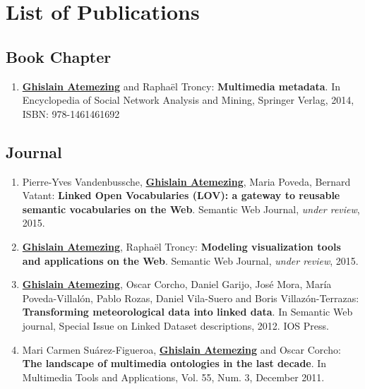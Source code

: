 \chapter*{List of Publications}

\section*{Book Chapter}
\label{sec:book}
\begin{enumerate}
\item \underline{\textbf{Ghislain Atemezing}} and {R}apha{\"e}l {T}roncy: \textbf{{M}ultimedia metadata}. {I}n {E}ncyclopedia of {S}ocial {N}etwork {A}nalysis and {M}ining, {S}pringer {V}erlag, 2014, {ISBN}: 978-1461461692
\end{enumerate}

\section*{Journal}
\label{sec:journal}
\begin{enumerate}
 \item Pierre-Yves Vandenbussche, \underline{\textbf{Ghislain Atemezing}}, Maria Poveda, Bernard Vatant: \textbf{Linked Open Vocabularies (LOV): a gateway to reusable semantic vocabularies on the Web}. Semantic Web Journal, \emph{under review}, 2015.
 \item \underline{\textbf{Ghislain Atemezing}}, {R}apha{\"e}l {T}roncy: \textbf{Modeling visualization tools and applications on the Web}. Semantic Web Journal, \emph{under review}, 2015.
 \item \underline{\textbf{{G}hislain {A}temezing}}, {O}scar {C}orcho,  {D}aniel {G}arijo, {J}os{\'e} {M}ora, {M}ar{\'i}a {P}oveda-{V}illal{\'o}n, {P}ablo {R}ozas, {D}aniel {V}ila-{S}uero and {B}oris {V}illaz{\'o}n-{T}errazas: \textbf{{T}ransforming meteorological data into linked data}. In {S}emantic {W}eb journal, {S}pecial {I}ssue on {L}inked {D}ataset descriptions, 2012. {IOS} {P}ress.

 \item Mari Carmen Su\'{a}rez-Figueroa, \underline{\textbf{Ghislain Atemezing}} and Oscar Corcho: \textbf{The landscape of multimedia ontologies in the last decade}. In Multimedia Tools and Applications, Vol. 55, Num. 3, December 2011.
\end{enumerate}

